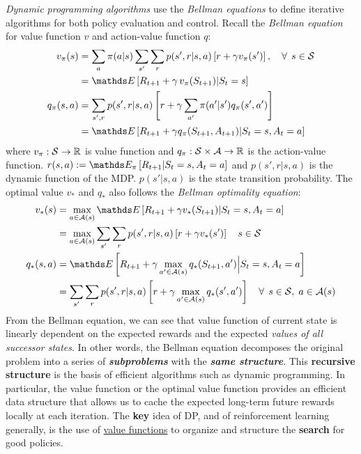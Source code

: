 \documentclass[11pt]{article}
\begin{document}
\emph{Dynamic programming algorithms} use the \emph{Bellman equations} to define iterative algorithms for both policy evaluation and control.  Recall the \emph{Bellman equation} for value function $v$ and action-value function $q$: 
\begin{align}
v_{\pi}(s) &=  \sum_{a}\pi(a|s)\sum_{s'}\sum_{r}p(s', r| s, a)\brac{r + \gamma v_{\pi}(s')}, \quad \forall\,\; s\in \cS \label{eqn: bellman_eqn_value} \\
&= \E{}{R_{t+1}  + \gamma\,v_{\pi}(S_{t+1}) | S_{t} = s} \label{eqn: bellman_eqn_value3}\\
q_{\pi}(s, a) &=\sum_{s', r}p(s', r|s,a)\brac{r+ \gamma \sum_{a'}\pi(a'|s')q_{\pi}(s', a')} \label{eqn: bellman_eqn_value_action}\\
&=\E{}{R_{t+1} + \gamma q_{\pi}(S_{t+1}, A_{t+1}) | S_{t}=s, A_{t}=a}  \label{eqn: bellman_eqn_value_action_3}
\end{align}
where $v_{\pi}: {\mathcal S} \rightarrow {\mathbb R}$ is value function and $q_{\pi}: {\mathcal S} \times {\mathcal A} \rightarrow {\mathbb R}$ is the action-value function. $r(s, a) := \E{\pi}{R_{t+1}|S_{t}=s, A_{t}=a}$ and $p(s', r| s, a)$ is the dynamic function of the MDP. $p(s'| s, a)$ is the state transition probability. The optimal value $v_{*}$ and $q_{*}$ also follows the \emph{Bellman optimality equation}:
\begin{align}
v_{*}(s) &=  \max_{a\in \cA(s)}\E{}{R_{t+1} + \gamma v_{*}(S_{t+1}) | S_{t}=s, A_{t}=a} \label{eqn: bellman_eqn_optimal_value}\\
&= \max_{a\in \cA(s)}\sum_{s'}\sum_{r}p(s', r|s, a)\brac{r + \gamma v_{*}(s')} \quad s\in \cS \label{eqn: bellman_eqn_optimal_value2} \\
q_{*}(s, a) &=  \E{}{R_{t+1} + \gamma \max_{a'\in \cA(s)}q_{*}(S_{t+1}, a') \Big| S_{t}=s, A_{t}=a} \label{eqn: bellman_eqn_optimal_value_action3}\\
&=\sum_{s'}\sum_{r}p(s', r|s, a)\brac{r + \gamma  \max_{a'\in \cA(s)}q_{*}(s', a')} \quad \forall\,\; s\in \cS, \; a\in \cA(s) \label{eqn: bellman_eqn_optimal_value_action2}
\end{align} From the Bellman equation, we can see that value function of current state is linearly dependent on the expected rewards and the expected\emph{ values of all successor states}. In other words, the Bellman equation decomposes the original problem into a series of \emph{\textbf{subproblems}} with the \emph{\textbf{same structure}}. This \textbf{recursive structure} is the basis of efficient algorithms such as dynamic programming. In particular, the value function or the optimal value function provides an efficient data structure that allows us to cache the expected long-term future rewards locally at each iteration. The \textbf{key} idea of DP, and of reinforcement learning generally, is the use of \underline{value functions} to organize and structure the \textbf{search} for good policies.
\end{document}
